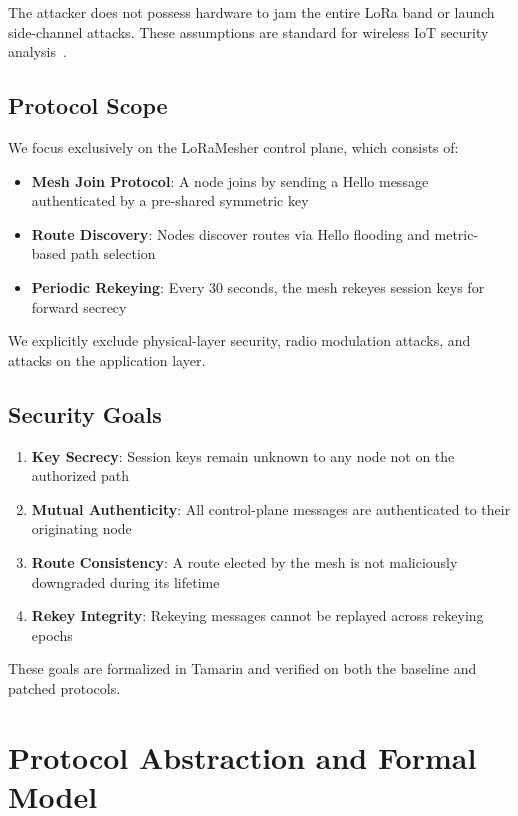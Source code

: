 \documentclass[10pt,journal]{IEEEtran}
\begin{document}
The attacker does not possess hardware to jam the entire LoRa band or launch side-channel attacks. These assumptions are standard for wireless IoT security analysis~\cite{ieee2025-lorawan-key-vulnerability}.

\subsection{Protocol Scope}

We focus exclusively on the LoRaMesher control plane, which consists of:
\begin{itemize}
	\item \textbf{Mesh Join Protocol}: A node joins by sending a Hello message authenticated by a pre-shared symmetric key
	\item \textbf{Route Discovery}: Nodes discover routes via Hello flooding and metric-based path selection
	\item \textbf{Periodic Rekeying}: Every 30 seconds, the mesh rekeyes session keys for forward secrecy
\end{itemize}

We explicitly exclude physical-layer security, radio modulation attacks, and attacks on the application layer.

\subsection{Security Goals}

\begin{enumerate}
	\item \textbf{Key Secrecy}: Session keys remain unknown to any node not on the authorized path
	\item \textbf{Mutual Authenticity}: All control-plane messages are authenticated to their originating node
	\item \textbf{Route Consistency}: A route elected by the mesh is not maliciously downgraded during its lifetime
	\item \textbf{Rekey Integrity}: Rekeying messages cannot be replayed across rekeying epochs
\end{enumerate}

These goals are formalized in Tamarin and verified on both the baseline and patched protocols.

\section{Protocol Abstraction and Formal Model}
\end{document}
